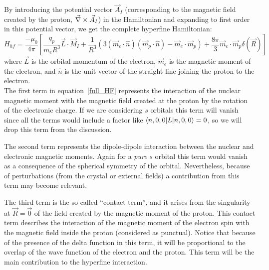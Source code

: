By introducing the potential vector $\vec{A}_{I}$ (corresponding to the magnetic field created by the proton, $\vec{\nabla}\times\vec{A}_{I}$) in the Hamiltonian and expanding to first order in this potential vector, we get the complete hyperfine Hamiltonian:~\cite{Cohen1977book}
\begin{equation}
H_{hf} = \frac{-\mu_{0}}{4\pi}\left[
\frac{q_{p}}{m_{e}R^{3}}\vec{L}\cdot\vec{M}_{I} +
\frac{1}{R^{3}}\left(3(\vec{m}_{e}\cdot\hat{n})
                      (\vec{m}_{p}\cdot\hat{n})-
                      \vec{m}_{e}\cdot\vec{m}_{p}\right) +
\frac{8\pi}{3}\vec{m}_{e}\cdot\vec{m}_{p}\delta(\vec{R})
\right]
\label{full_HF}
\end{equation}
where $\vec{L}$ is the orbital momentum of the electron, $\vec{m}_{e}$ is the magnetic moment of the electron, and $\hat{n}$ is the unit vector of the straight line joining the proton to the electron.\\

The first term in equation~\eqref{full_HF} represents the interaction of the nuclear magnetic moment with the magnetic field created at the proton by the rotation of the electronic charge. If we are considering $s$ orbitals this term will vanish since all the terms would include a factor like $\langle n,0,0|L|n,0,0\rangle = 0$, so we will drop this term from the discussion.

The second term represents the dipole-dipole interaction between the nuclear and electronic magnetic moments. Again for a \textit{pure} $s$ orbital this term would vanish as a consequence of the spherical symmetry of the orbital. Nevertheless, because of perturbations (from the crystal or external fields) a contribution from this term may become relevant. 

The third term is the so-called ``contact term'', and it arises from the singularity at $\vec{R}=\vec{0}$ of the field created by the magnetic moment of the proton.
This contact term describes the interaction of the magnetic moment of the electron spin with the magnetic field inside the proton (considered as punctual). Notice that because of the presence of the delta function in this term, it will be proportional to the overlap of the wave function of the electron and the proton. This term will be the main contribution to the hyperfine interaction.\\

